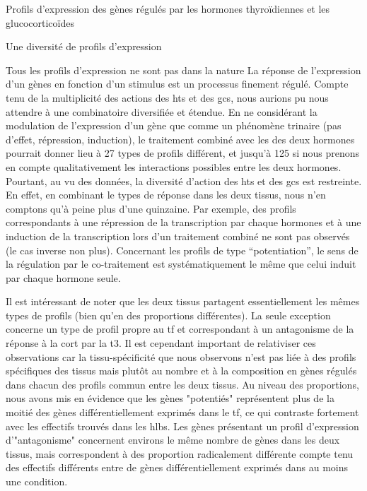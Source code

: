 \documentclass[../main.tex]{subfiles}
\begin{document}
\begin{chapter}{Profils d'expression des gènes régulés par les hormones thyroïdiennes et les glucocorticoïdes}


\begin{section}{Une diversité de profils d'expression}

\begin{subsection}{Tous les profils d'expression ne sont pas dans la nature}
La réponse de l'expression d'un gènes en fonction d'un stimulus est un processus finement régulé.
Compte tenu de la multiplicité des actions des \glspl{ht} et des \glspl{gc}, nous aurions pu nous attendre à une combinatoire diversifiée et étendue.
En ne considérant la modulation de l'expression d'un gène que comme un phénomène trinaire (pas d'effet, répression, induction), le traitement combiné avec les des deux hormones pourrait donner lieu à 27 types de profils différent, et jusqu'à 125 si nous prenons en compte qualitativement les interactions possibles entre les deux hormones.
Pourtant, au vu des données, la diversité d'action des \glspl{ht} et des \glspl{gc} est restreinte.
En effet, en combinant le types de réponse dans les deux tissus, nous n'en comptons qu'à peine plus d'une quinzaine.
Par exemple, des profils correspondants à une répression de la transcription par chaque hormones et à une induction de la transcription lors d'un traitement combiné ne sont pas observés (le cas inverse non plus).
Concernant les profils de type ``potentiation'', le sens de la régulation par le co-traitement est systématiquement le même que celui induit par chaque hormone seule.
\par
Il est intéressant de noter que les deux tissus partagent essentiellement les mêmes types de profils (bien qu'en des proportions différentes).
La seule exception concerne un type de profil propre au \gls{tf} et correspondant à un antagonisme de la réponse à la \gls{cort} par la \gls{t3}.
Il est cependant important de relativiser ces observations car la tissu-spécificité que nous observons n'est pas liée à des profils spécifiques des tissus mais plutôt au nombre et à la composition en gènes régulés dans chacun des profils commun entre les deux tissus.
Au niveau des proportions, nous avons mis en évidence que les gènes "potentiés" représentent plus de la moitié des gènes différentiellement exprimés dans le \gls{tf}, ce qui contraste fortement avec les effectifs trouvés dans les \glspl{hlb}.
Les gènes présentant un profil d'expression d'"antagonisme" concernent environs le même nombre de gènes dans les deux tissus, mais correspondent à des proportion radicalement différente compte tenu des effectifs différents entre de gènes différentiellement exprimés dans au moins une condition.
\end{subsection}


\end{section}
\end{chapter}
\end{document}
